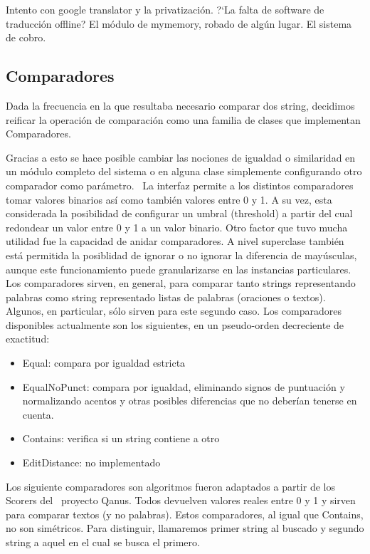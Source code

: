 Intento con google translator y la privatizaci\'on. ?`La falta de
software de traducci\'on offline? El m\'odulo de mymemory, robado de
alg\'un lugar. El sistema de cobro. 

\subsection{Comparadores}

Dada la frecuencia en la que resultaba necesario comparar dos string,
decidimos reificar la operaci\'on de comparaci\'on como una familia de
clases que implementan Comparadores. 

Gracias a esto se hace posible cambiar las nociones de igualdad o
similaridad en un m\'odulo completo del sistema o en alguna clase
simplemente configurando otro comparador como par\'ametro. \ La
interfaz permite a los distintos comparadores tomar valores binarios
as\'i como tambi\'en valores entre 0 y 1. A su vez, esta considerada la
posibilidad de configurar un umbral (threshold) a partir del cual
redondear un valor entre 0 y 1 a un valor binario. Otro factor que tuvo
mucha utilidad fue la capacidad de anidar comparadores. A nivel
superclase tambi\'en est\'a permitida la posiblidad de ignorar o no
ignorar la diferencia de may\'usculas, aunque este funcionamiento puede
granularizarse en las instancias particulares. Los comparadores sirven,
en general, para comparar tanto strings representando palabras como
string representado listas de palabras (oraciones o textos). Algunos,
en particular, s\'olo sirven para este segundo caso. Los comparadores
disponibles actualmente son los siguientes, en un pseudo-orden
decreciente de exactitud:


\begin{itemize}
\item Equal: compara por igualdad estricta
\item EqualNoPunct: compara por igualdad, eliminando signos de
puntuaci\'on y normalizando acentos y otras posibles diferencias que no
deber\'ian tenerse en cuenta.
\item Contains: verifica si un string contiene a otro
\item EditDistance: no implementado
\end{itemize}
Los siguiente comparadores son algoritmos fueron adaptados a partir de
los Scorers del \ proyecto Qanus. Todos devuelven valores reales entre
0 y 1 y sirven para comparar textos (y no palabras). Estos
comparadores, al igual que Contains, no son sim\'etricos. Para
distinguir, llamaremos primer string al buscado y segundo string a
aquel en el cual se busca el primero. 


